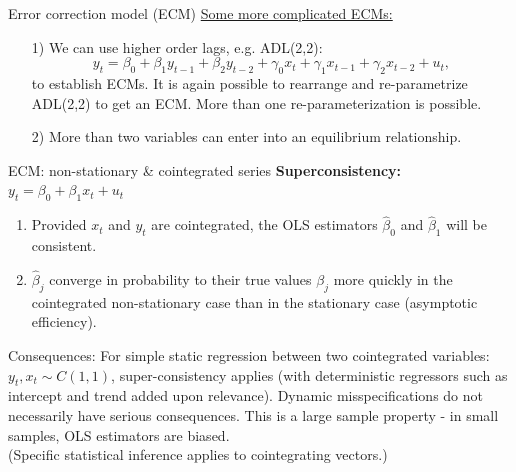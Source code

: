\documentclass{beamer}
\begin{document}
\begin{frame}{Error correction model (ECM)}
\underline{Some more complicated ECMs:}\\
\bigskip
\begin{itemize}
\item[1)] We can use higher order lags, e.g. ADL(2,2):
$$y_t = \beta_0 + \beta_1 y_{t-1} + \beta_2 y_{t-2} +
         \gamma_0 x_t + \gamma_1 x_{t-1} + \gamma_2 x_{t-2} + u_t,$$
to establish ECMs. It is again possible to rearrange and re-parametrize ADL(2,2) to get an ECM. More than one re-parameterization is possible.\\
\bigskip
\item[2)] More than two variables can enter into an equilibrium relationship. 
\end{itemize}
\end{frame}
\begin{frame}{ECM: non-stationary \& cointegrated series}
\textbf{Superconsistency:} $y_t =  \beta_0 + \beta_1 x_t + u_t$\\
\begin{enumerate}
\item Provided $x_t$ and $y_t$ are cointegrated, the OLS estimators $\hat{\beta}_0$ and $\hat{\beta}_1$ will be consistent. 
\item $\hat{\beta}_j$ converge in probability to their true values $\beta_j$ more quickly in the cointegrated non-stationary case than in the stationary case (asymptotic efficiency).
\end{enumerate}
\begin{block}{Consequences:}
For simple static regression between two cointegrated variables: $y_t, x_t \sim C(1,1)$, super-consistency applies (with deterministic regressors such as intercept and trend added upon relevance). Dynamic misspecifications do not necessarily have serious consequences. This is a large sample property - in small samples, OLS estimators are biased.\\ (Specific statistical inference applies to cointegrating vectors.)
\end{block}
\end{frame}
\end{document}
